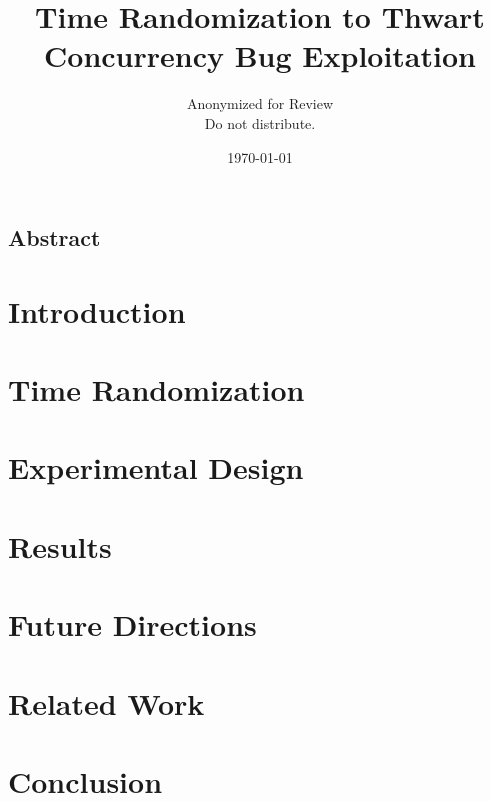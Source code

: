 \documentclass[letterpaper,twocolumn,10pt]{article}
\begin{document}
\date{\today}

\title{\Large \bf Time Randomization to Thwart Concurrency Bug Exploitation}

\author{
{\rm Anonymized for Review}\\
Do not distribute.
} %

\maketitle

\subsection*{Abstract}


\section{Introduction}


\section{Time Randomization}


\section{Experimental Design}


\section{Results}\label{results}


\section{Future Directions}


\section{Related Work}


\section{Conclusion}



{\footnotesize 
}
\end{document}
